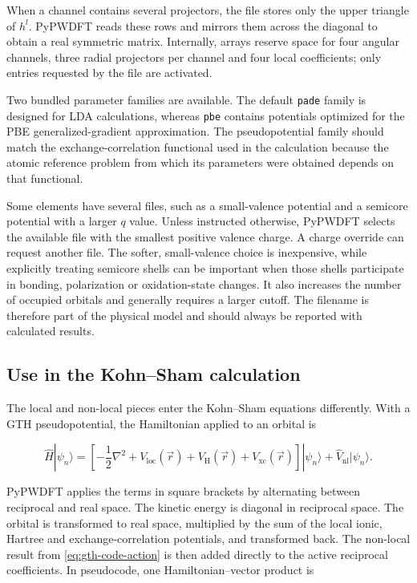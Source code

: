When a channel contains several projectors, the file stores only the upper triangle of $h^{l}$. PyPWDFT reads these rows and mirrors them across the diagonal to obtain a real symmetric matrix. Internally, arrays reserve space for four angular channels, three radial projectors per channel and four local coefficients; only entries requested by the file are activated.

Two bundled parameter families are available. The default \texttt{pade} family is designed for LDA calculations, whereas \texttt{pbe} contains potentials optimized for the PBE generalized-gradient approximation.\cite{2005:krack} The pseudopotential family should match the exchange-correlation functional used in the calculation because the atomic reference problem from which its parameters were obtained depends on that functional.

Some elements have several files, such as a small-valence potential and a semicore potential with a larger $q$ value. Unless instructed otherwise, PyPWDFT selects the available file with the smallest positive valence charge. A charge override can request another file. The softer, small-valence choice is inexpensive, while explicitly treating semicore shells can be important when those shells participate in bonding, polarization or oxidation-state changes. It also increases the number of occupied orbitals and generally requires a larger cutoff. The filename is therefore part of the physical model and should always be reported with calculated results.

%
%
%
\subsection{Use in the Kohn--Sham calculation}

The local and non-local pieces enter the Kohn--Sham equations differently. With a GTH pseudopotential, the Hamiltonian applied to an orbital is

\begin{equation}
    \hat{H}|\psi_{n}\rangle =
    \left[-\frac{1}{2}\nabla^{2}
    +V_{\text{loc}}(\vec{r})
    +V_{\text{H}}(\vec{r})
    +V_{\text{xc}}(\vec{r})\right]|\psi_{n}\rangle
    +\hat{V}_{\text{nl}}|\psi_{n}\rangle.
    \label{eq:gth-hamiltonian}
\end{equation}

PyPWDFT applies the terms in square brackets by alternating between reciprocal and real space. The kinetic energy is diagonal in reciprocal space. The orbital is transformed to real space, multiplied by the sum of the local ionic, Hartree and exchange-correlation potentials, and transformed back. The non-local result from \cref{eq:gth-code-action} is then added directly to the active reciprocal coefficients. In pseudocode, one Hamiltonian--vector product is

